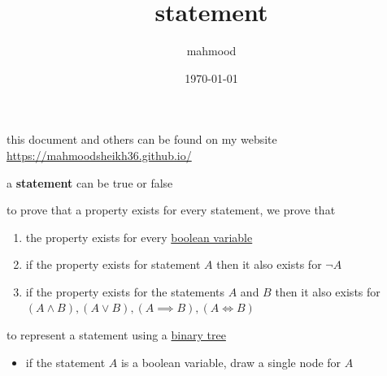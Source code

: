 \documentclass[a4paper,12pt]{article}
\author{mahmood}
\date{\today}
\title{statement}
\begin{document}
\maketitle
\begin{note}
this document and others can be found on my website\\
\url{https://mahmoodsheikh36.github.io/}
\end{note}
\begin{definition}
a \textbf{statement} can be true or false\\
\end{definition}
\begin{characteristic}
to prove that a property exists for every statement, we prove that\\
\begin{enumerate}
\item the property exists for every \href{20230401175954-boolean_variable.org}{boolean variable}\\
\item if the property exists for statement \(A\) then it also exists for \(\lnot A\)\\
\item if the property exists for the statements \(A\) and \(B\) then it also exists for \((A \land B),(A \lor B),(A \implies B),(A \iff B)\)\\
\end{enumerate}
\end{characteristic}
\begin{characteristic}
to represent a statement using a \href{data_structures.org}{binary tree}\\
\begin{itemize}
\item if the statement \(A\) is a boolean variable, draw a single node for \(A\)\\
\end{itemize}
\end{characteristic}
\end{document}

